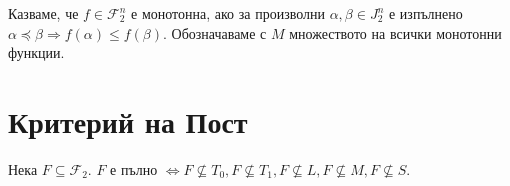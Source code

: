 \documentclass[fleqn,12pt]{article}
\begin{document}
\begin{flushleft}
Казваме, че $f \in \mathcal{F}_2^n$ е монотонна, ако за произволни $\alpha, \beta \in J_2^n$ е изпълнено
$\alpha \preceq \beta \Rightarrow f(\alpha) \leq f(\beta)$. Обозначаваме с $M$ множеството на всички монотонни функции.

\section{Критерий на Пост}
Нека $F \subseteq \mathcal{F}_2$. $F$ е пълно $\Leftrightarrow F \nsubseteq T_0, F \nsubseteq T_1, F \nsubseteq L, F \nsubseteq M, F \nsubseteq S$.    

\end{flushleft}
\end{document}
